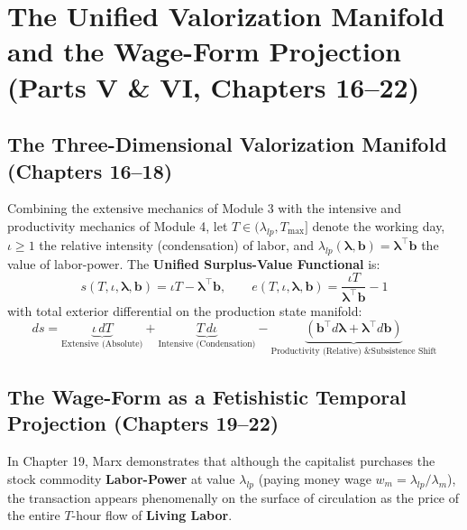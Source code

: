 \documentclass[11pt,a4paper]{article}
\begin{document}
\section{The Unified Valorization Manifold and the Wage-Form Projection (Parts V \& VI, Chapters 16--22)}

\subsection{The Three-Dimensional Valorization Manifold (Chapters 16--18)}

Combining the extensive mechanics of Module 3 with the intensive and productivity mechanics of Module 4, let $T \in (\lambda_{lp}, T_{\max}]$ denote the working day, $\iota \ge 1$ the relative intensity (condensation) of labor, and $\lambda_{lp}(\boldsymbol{\lambda}, \mathbf{b}) = \boldsymbol{\lambda}^\top \mathbf{b}$ the value of labor-power. The \textbf{Unified Surplus-Value Functional} is:
\begin{equation}
    s(T, \iota, \boldsymbol{\lambda}, \mathbf{b}) = \iota T - \boldsymbol{\lambda}^\top \mathbf{b}, \qquad e(T, \iota, \boldsymbol{\lambda}, \mathbf{b}) = \frac{\iota T}{\boldsymbol{\lambda}^\top \mathbf{b}} - 1
\end{equation}
with total exterior differential on the production state manifold:
\begin{equation}
    ds = \underbrace{\iota \, dT}_{\text{Extensive (Absolute)}} + \underbrace{T \, d\iota}_{\text{Intensive (Condensation)}} - \underbrace{\left(\mathbf{b}^\top d\boldsymbol{\lambda} + \boldsymbol{\lambda}^\top d\mathbf{b}\right)}_{\text{Productivity (Relative) \& Subsistence Shift}}
\end{equation}

\subsection{The Wage-Form as a Fetishistic Temporal Projection (Chapters 19--22)}

In Chapter 19, Marx demonstrates that although the capitalist purchases the stock commodity \textbf{Labor-Power} at value $\lambda_{lp}$ (paying money wage $w_m = \lambda_{lp}/\lambda_m$), the transaction appears phenomenally on the surface of circulation as the price of the entire $T$-hour flow of \textbf{Living Labor}.
\end{document}
